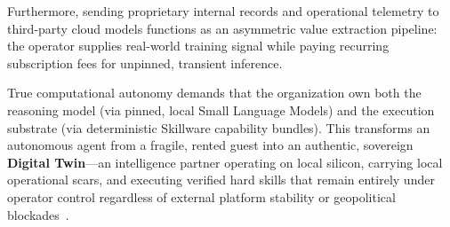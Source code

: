 Furthermore, sending proprietary internal records and operational telemetry to third-party cloud models functions as an asymmetric value extraction pipeline: the operator supplies real-world training signal while paying recurring subscription fees for unpinned, transient inference.

True computational autonomy demands that the organization own both the reasoning model (via pinned, local Small Language Models) and the execution substrate (via deterministic Skillware capability bundles). This transforms an autonomous agent from a fragile, rented guest into an authentic, sovereign \textbf{Digital Twin}---an intelligence partner operating on local silicon, carrying local operational scars, and executing verified hard skills that remain entirely under operator control regardless of external platform stability or geopolitical blockades~\cite{peilivanidis2024cognitivepow}.
